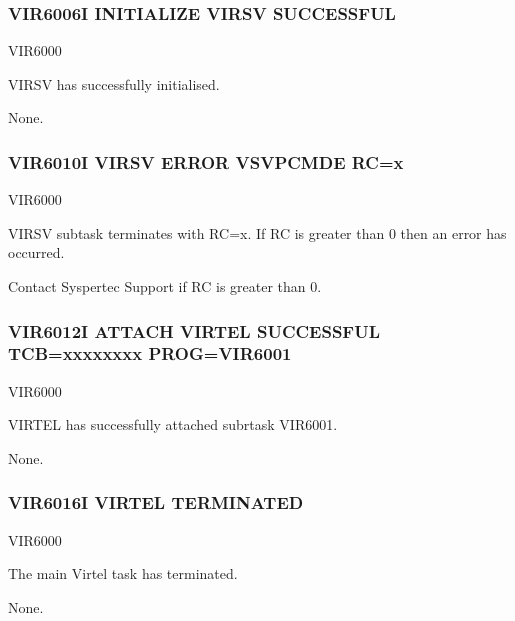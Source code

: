 \documentclass[letterpaper,10pt,english]{sphinxmanual}
\begin{document}
\subsubsection{VIR6006I INITIALIZE VIRSV SUCCESSFUL}
\label{\detokenize{messages:vir6006i-initialize-virsv-successful}}\begin{description}
\sphinxAtStartPar
VIR6000

\sphinxAtStartPar
VIRSV has successfully initialised.

\sphinxAtStartPar
None.

\end{description}


\subsubsection{VIR6010I VIRSV ERROR VSVPCMDE RC=x}
\label{\detokenize{messages:vir6010i-virsv-error-vsvpcmde-rc-x}}\begin{description}
\sphinxAtStartPar
VIR6000

\sphinxAtStartPar
VIRSV subtask terminates with RC=x. If RC is greater than 0 then an error has occurred.

\sphinxAtStartPar
Contact Syspertec Support if RC is greater than 0.

\end{description}


\subsubsection{VIR6012I ATTACH VIRTEL SUCCESSFUL TCB=xxxxxxxx PROG=VIR6001}
\label{\detokenize{messages:vir6012i-attach-virtel-successful-tcb-xxxxxxxx-prog-vir6001}}\begin{description}
\sphinxAtStartPar
VIR6000

\sphinxAtStartPar
VIRTEL has successfully attached subrtask VIR6001.

\sphinxAtStartPar
None.

\end{description}


\subsubsection{VIR6016I VIRTEL TERMINATED}
\label{\detokenize{messages:vir6016i-virtel-terminated}}\begin{description}
\sphinxAtStartPar
VIR6000

\sphinxAtStartPar
The main Virtel task has terminated.

\sphinxAtStartPar
None.

\end{description}
\end{document}
